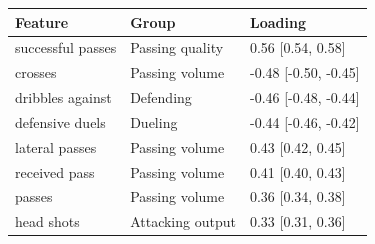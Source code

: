 
\begin{tabular}{lll}
\toprule
Feature & Group & Loading\\
\midrule
successful passes & Passing quality & 0.56 [0.54, 0.58]\\
crosses & Passing volume & -0.48 [-0.50, -0.45]\\
dribbles against & Defending & -0.46 [-0.48, -0.44]\\
defensive duels & Dueling & -0.44 [-0.46, -0.42]\\
lateral passes & Passing volume & 0.43 [0.42, 0.45]\\
received pass & Passing volume & 0.41 [0.40, 0.43]\\
passes & Passing volume & 0.36 [0.34, 0.38]\\
head shots & Attacking output & 0.33 [0.31, 0.36]\\
\bottomrule
\end{tabular}
